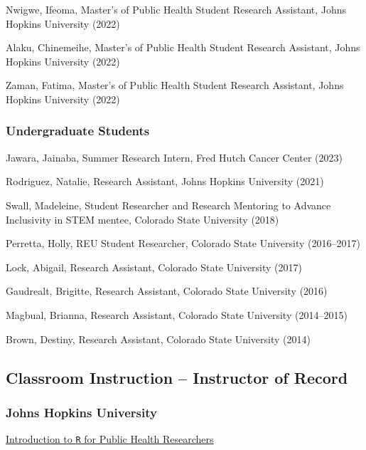 \documentclass{cv}
\begin{document}
Nwigwe, Ifeoma, Master's of Public Health Student Research Assistant, Johns Hopkins University (2022)

Alaku, Chinemeihe, Master's of Public Health Student Research Assistant, Johns Hopkins University (2022)

Zaman, Fatima, Master's of Public Health Student Research Assistant, Johns Hopkins University (2022)

\subsubsection*{Undergraduate Students}

Jawara, Jainaba, Summer Research Intern, Fred Hutch Cancer Center (2023)

Rodriguez, Natalie, Research Assistant, Johns Hopkins University (2021)

Swall, Madeleine, Student Researcher and Research Mentoring to Advance Inclusivity in STEM mentee, Colorado State University (2018)

Perretta, Holly, REU Student Researcher, Colorado State University (2016--2017)

Lock, Abigail, Research Assistant, Colorado State University (2017)

Gaudrealt, Brigitte, Research Assistant, Colorado State University (2016)

Magbual, Brianna, Research Assistant, Colorado State University (2014--2015)

Brown, Destiny, Research Assistant, Colorado State University (2014)

\subsection*{Classroom Instruction -- Instructor of Record}

\subsubsection*{Johns Hopkins University}

\href{https://jhudatascience.org/intro_to_R/}{Introduction to \texttt{R} for Public Health Researchers}
\end{document}
